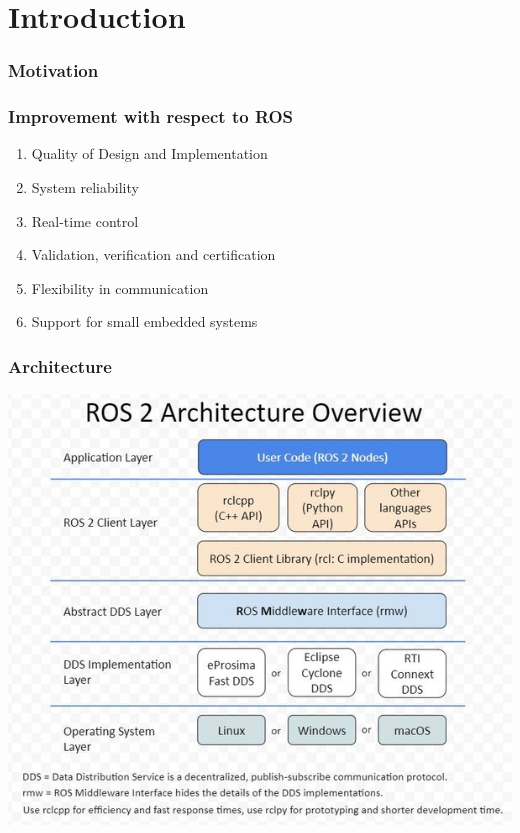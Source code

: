 \part{Introduction}

  \section*{Motivation}




  
  \section*{Improvement with respect to ROS}

    \begin{enumerate}
      \item Quality of Design and Implementation
      \item System reliability
      \item Real-time control
      \item Validation, verification and certification
      \item Flexibility in communication
      \item Support for small embedded systems
    \end{enumerate}

    


  \section*{Architecture}

    \includegraphics[width=\textwidth]{pictures/ros2_architecture.jpg}


